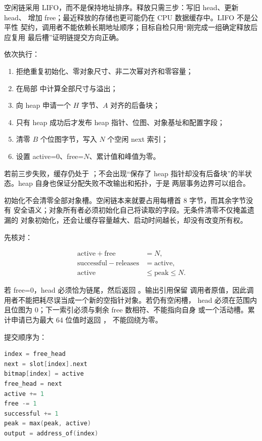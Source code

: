 空闲链采用 LIFO，而不是保持地址排序。释放只需三步：写旧 head、更新 head、
增加 free；最近释放的存储也更可能仍在 CPU 数据缓存中。LIFO 不是公平性
契约，调用者不能依赖长期地址顺序；目标自检只用“刚完成一组确定释放后应复用
最后槽”证明链提交方向正确。

 依次执行：

\begin{enumerate}[label=\arabic*.]
  \item 拒绝重复初始化、零对象尺寸、非二次幂对齐和零容量；
  \item 在局部  中计算全部尺寸与溢出；
  \item 向 heap 申请一个 \(H\) 字节、\(A\) 对齐的后备块；
  \item 只有 heap 成功后才发布 heap 指针、位图、对象基址和配置字段；
  \item 清零 \(B\) 个位图字节，写入 \(N\) 个空闲 next 索引；
  \item 设置 active=0、free=\(N\)、累计值和峰值为零。
\end{enumerate}

若前三步失败，缓存仍处于 ；不会出现“保存了 heap
指针却没有后备块”的半状态。heap 自身也保证分配失败不改输出和拓扑，于是
两层事务边界可以组合。

初始化不会清零全部对象槽。空闲链本来就要占用每槽首 8 字节，而其余字节没有
安全语义；对象所有者必须初始化自己将读取的字段。无条件清零不仅掩盖遗漏的
对象初始化，还会让缓存容量越大、启动时间越长，却没有改变所有权。

 先核对：

\[
\begin{aligned}
\mathrm{active}+\mathrm{free}&=N,\\
\mathrm{successful}-\mathrm{releases}&=\mathrm{active},\\
\mathrm{active}&\le\mathrm{peak}\le N.
\end{aligned}
\]

若 free=0，head 必须恰为链尾，然后返回 。输出引用保留
调用者原值，因此调用者不能把耗尽误当成一个新的空指针对象。若仍有空闲槽，
head 必须在范围内且位图为 0；下一索引必须与剩余 free 数相符、不能指向自身
或一个活动槽。累计申请已为最大 64 位值时返回 ，
不能回绕为零。

提交顺序为：

\begin{lstlisting}[language=C++]
index = free_head
next = slot[index].next
bitmap[index] = active
free_head = next
active += 1
free -= 1
successful += 1
peak = max(peak, active)
output = address_of(index)
\end{lstlisting}

